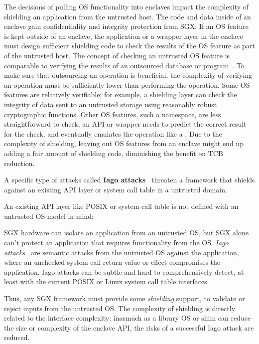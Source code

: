 The decisions of pulling OS functionality into enclaves
impact the complexity of shielding an application from the untrusted host.
The code and data inside of an enclave
gain confidentiality and integrity protection from SGX;
If an OS feature is kept outside of an enclave, the application or a wrapper layer in the enclave must design
sufficient shielding code to check the results of the OS feature
as part of the untrusted host.
The concept of checking an untrusted OS feature
is comparable to verifying the results of an outsourced database or program~\cite{bajaj13correctdb,zhang15integridb,ben2013snarks}.
To make sure that outsourcing an operation is beneficial,
the complexity of verifying an operation must be sufficiently lower than performing the operation.
Some OS features are relatively verifiable;
for example, a shielding layer can check the integrity of data sent to an untrusted storage using reasonably robust cryptographic functions.
Other OS features, such a namespace, are less straightforward to check;
an API or \linuxapi{} wrapper needs to predict the correct result for the check, and eventually emulates the operation like a \libos{}.
Due to the complexity of shielding, leaving out OS features from an enclave might end up adding a fair amount of shielding code, diminishing the benefit on TCB reduction.



A specific type of attacks called {\bf Iago attacks}~\cite{checkoway13iago}
threaten a framework that shields against an existing API layer or system call table in a untrusted domain.
\citeauthor{checkoway13iago}



An existing API layer like POSIX or system call table is not defined with an untrusted OS model in mind;

SGX hardware can isolate an application from an untrusted OS, but 
SGX alone can't protect an application that  requires
functionality from the OS.  {\em Iago attacks}~\cite{checkoway13iago}
are semantic attacks from the untrusted OS against the application, where an unchecked system call return 
value or effect compromises the application.
Iago attacks can be subtle and hard to comprehensively detect, at least with the current
POSIX or Linux system call table interfaces.

Thus, any SGX framework must provide some {\em shielding} support, to 
validate or reject inputs from the untrusted OS.  
The complexity of shielding is directly related to the interface complexity:
inasmuch as a library OS or shim can reduce the size or complexity of the 
enclave API, 
the risks of a successful Iago attack are reduced.


